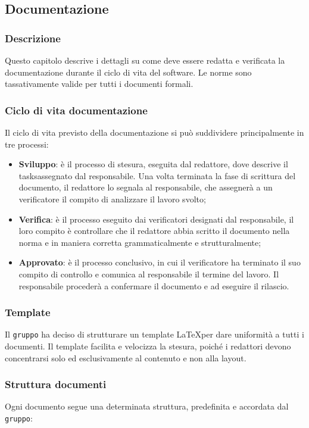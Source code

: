 \subsection{Documentazione}\label{documentazione}

\subsubsection{Descrizione}
Questo capitolo descrive i dettagli su come deve essere redatta e verificata la documentazione durante il ciclo di vita del software. Le norme sono tassativamente valide per tutti i documenti formali.
\subsubsection{Ciclo di vita documentazione}
Il ciclo di vita previsto della documentazione si può suddividere principalmente in tre processi: 
\begin{itemize}
	\item \textbf{Sviluppo}: è il processo di stesura, eseguita dal redattore, dove descrive il tasks\glossario assegnato dal responsabile. Una volta terminata la fase di scrittura del documento, il redattore lo segnala al responsabile, che assegnerà a un verificatore il compito di	analizzare il lavoro svolto;
 	\item \textbf{Verifica}: è il processo eseguito dai verificatori designati dal responsabile, il loro compito è controllare che il redattore abbia scritto il documento nella norma e in maniera corretta grammaticalmente e strutturalmente;
 	\item \textbf{Approvato}: è il processo conclusivo, in cui il verificatore ha terminato il suo compito di controllo e comunica al responsabile il termine del lavoro. Il responsabile procederà a confermare il documento e ad eseguire il rilascio.
\end{itemize} 

\subsubsection{Template}
Il \texttt{gruppo} ha deciso di strutturare un template \LaTeX per dare uniformità a tutti i documenti. Il template facilita e velocizza la stesura, poiché i redattori devono concentrarsi solo ed esclusivamente al contenuto e non alla layout.  

\subsubsection{Struttura documenti}
Ogni documento segue una determinata struttura, predefinita e accordata dal \texttt{gruppo}:

